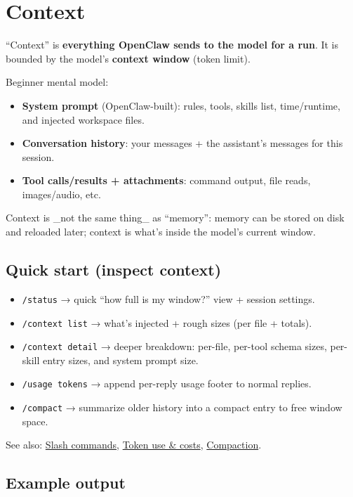 \clearpage

\section{Context}


“Context” is \textbf{everything OpenClaw sends to the model for a run}. It is bounded by the model’s \textbf{context window} (token limit).

Beginner mental model:

\begin{itemize}
  \item \textbf{System prompt} (OpenClaw-built): rules, tools, skills list, time/runtime, and injected workspace files.
  \item \textbf{Conversation history}: your messages + the assistant’s messages for this session.
  \item \textbf{Tool calls/results + attachments}: command output, file reads, images/audio, etc.
\end{itemize}


Context is \_not the same thing\_ as “memory”: memory can be stored on disk and reloaded later; context is what’s inside the model’s current window.

\subsection{Quick start (inspect context)}


\begin{itemize}
  \item \texttt{/status} → quick “how full is my window?” view + session settings.
  \item \texttt{/context list} → what’s injected + rough sizes (per file + totals).
  \item \texttt{/context detail} → deeper breakdown: per-file, per-tool schema sizes, per-skill entry sizes, and system prompt size.
  \item \texttt{/usage tokens} → append per-reply usage footer to normal replies.
  \item \texttt{/compact} → summarize older history into a compact entry to free window space.
\end{itemize}


See also: \href{/tools/slash-commands}{Slash commands}, \href{/reference/token-use}{Token use \& costs}, \href{/concepts/compaction}{Compaction}.

\subsection{Example output}


